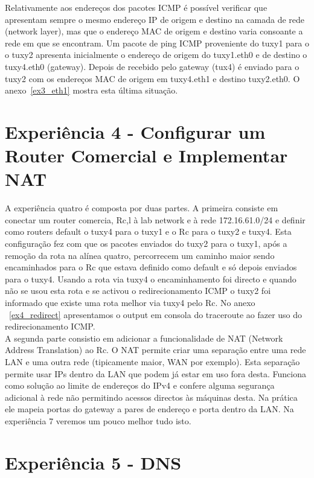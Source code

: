 \documentclass[11pt,a4paper,reqno]{report}
\numberwithin{equation}{section}
\begin{document}
Relativamente aos endereços dos pacotes ICMP é possível verificar que apresentam sempre o mesmo endereço IP de origem e destino na camada de rede (network layer), mas que o endereço MAC de origem e destino varia consoante a rede em que se encontram. Um pacote de ping ICMP proveniente do tuxy1 para o o tuxy2 apresenta inicialmente o endereço de origem do tuxy1.eth0 e de destino o tuxy4.eth0 (gateway). Depois de recebido pelo gateway (tux4) é enviado para o tuxy2 com os endereços MAC de origem em tuxy4.eth1 e destino tuxy2.eth0. O anexo~\ref{ex3_eth1} mostra esta última situação.



\section{Experiência 4 - Configurar um Router Comercial e Implementar NAT}
A experiência quatro é composta por duas partes. A primeira consiste em conectar um router comercia, Rc,l à lab network e à rede 172.16.61.0/24 e definir como routers default o tuxy4 para o tuxy1 e o Rc para o tuxy2 e tuxy4.
Esta configuração fez com que os pacotes enviados do tuxy2 para o tuxy1, após a remoção da rota na alínea quatro, percorrecem um caminho maior sendo encaminhados para o Rc que estava definido como default e só depois enviados para o tuxy4. Usando a rota via tuxy4 o encaminhamento foi directo e quando não se usou esta rota e se activou o redirecionamento ICMP o tuxy2 foi informado que existe uma rota melhor via tuxy4 pelo Rc. No anexo ~\ref{ex4_redirect} apresentamos o output em consola do traceroute ao fazer uso do redirecionamento ICMP.\\

A segunda parte consistio em adicionar a funcionalidade de NAT (Network Address Translation) ao Rc.
O NAT permite criar uma separação entre uma rede LAN e uma outra rede (tipicamente maior, WAN por exemplo). Esta separação permite usar IPs dentro da LAN que podem já estar em uso fora desta. Funciona como solução ao limite de endereços do IPv4 e confere alguma segurança adicional à rede não permitindo acessos directos às máquinas desta. Na prática ele mapeia portas do gateway a pares de endereço e porta dentro da LAN. Na experiência 7 veremos um pouco melhor tudo isto.\\

\section{Experiência 5 - DNS}
\end{document}
